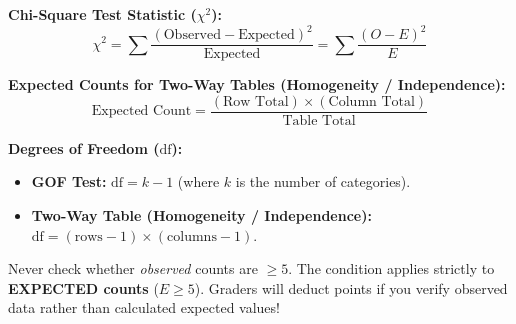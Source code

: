 \begin{formulabox}
\textbf{Chi-Square Test Statistic ($\chi^2$):}
\[
\chi^2 = \sum \frac{(\text{Observed} - \text{Expected})^2}{\text{Expected}} = \sum \frac{(O - E)^2}{E}
\]

\textbf{Expected Counts for Two-Way Tables (Homogeneity / Independence):}
\[
\text{Expected Count} = \frac{(\text{Row Total}) \times (\text{Column Total})}{\text{Table Total}}
\]

\textbf{Degrees of Freedom ($\text{df}$):}
\begin{itemize}
    \item \textbf{GOF Test:} $\text{df} = k - 1$ (where $k$ is the number of categories).
    \item \textbf{Two-Way Table (Homogeneity / Independence):} $\text{df} = (\text{rows} - 1) \times (\text{columns} - 1)$.
\end{itemize}
\end{formulabox}

\begin{trapbox}
Never check whether \emph{observed} counts are $\ge 5$. The condition applies strictly to \textbf{EXPECTED counts} ($E \ge 5$). Graders will deduct points if you verify observed data rather than calculated expected values!
\end{trapbox}
